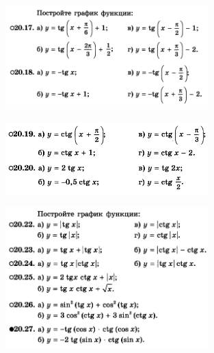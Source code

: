\newpage

\begin{figure}[h!]
	\centering
	\includegraphics[width=0.7\textwidth]{img/tg_t2.png}
\end{figure}

\begin{figure}[h!]
	\centering
	\includegraphics[width=0.7\textwidth]{img/ctg_t1.png}
\end{figure}

\begin{figure}[h!]
	\centering
	\includegraphics[width=0.7\textwidth]{img/ctg_t2.png}
\end{figure}